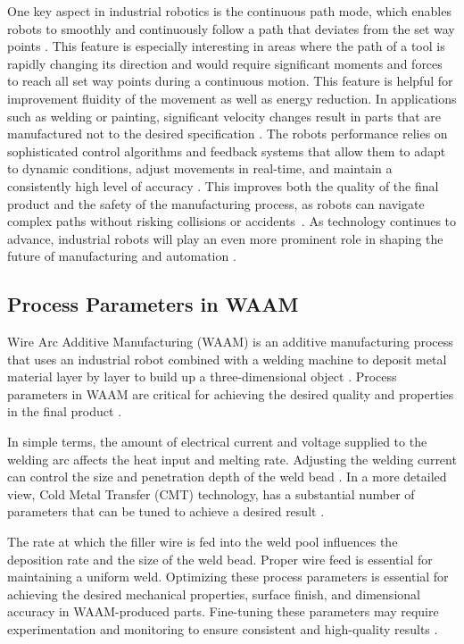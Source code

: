 \documentclass[ZLstudentexpose%
              ,optBiber%
              ,optEnglish%
              ,10pt
              ]{ZLlatex}%
\begin{document}
One key aspect in industrial robotics is the continuous path mode, which enables robots to smoothly and continuously follow a path that deviates from the set way points \cite{Chen.2017}. This feature is especially interesting in areas where the path of a tool is rapidly changing its direction and would require significant moments and forces to reach all set way points during a continuous motion.
This feature is helpful for improvement fluidity of the movement as well as energy reduction. In applications such as welding or painting, significant velocity changes result in parts that are manufactured not to the desired specification \cite{Bigliardi.2023}. 
\newpage
The robots performance relies on sophisticated control algorithms and feedback systems that allow them to adapt to dynamic conditions, adjust movements in real-time, and maintain a consistently high level of accuracy \cite{Lin.2023}. This improves both the quality of the final product and the safety of the manufacturing process, as robots can navigate complex paths without risking collisions or accidents~\cite{Bosscher.2011}.
As technology continues to advance, industrial robots will play an even more prominent role in shaping the future of manufacturing and automation \cite{Domae.2019}.


\subsection{Process Parameters in WAAM}
Wire Arc Additive Manufacturing (WAAM) is an additive manufacturing process that uses an industrial robot combined with a welding machine to deposit metal material layer by layer to build up a three-dimensional object \cite{Rodrigues.2019}. Process parameters in WAAM are critical for achieving the desired quality and properties in the final product \cite{Dinovitzer.2019}.

In simple terms, the amount of electrical current and voltage supplied to the welding arc affects the heat input and melting rate. Adjusting the welding current can control the size and penetration depth of the weld bead \cite{Tomar.2022}. In a more detailed view, Cold Metal Transfer (CMT) technology, has a substantial  number of parameters that can be tuned to achieve a desired result \cite{Selvi.2018}.   

The rate at which the filler wire is fed into the weld pool influences the deposition rate and the size of the weld bead. Proper wire feed is essential for maintaining a uniform weld. Optimizing these process parameters is essential for achieving the desired mechanical properties, surface finish, and dimensional accuracy in WAAM-produced parts. Fine-tuning these parameters may require experimentation and monitoring to ensure consistent and high-quality results \cite{Muller.2019}.
\end{document}

